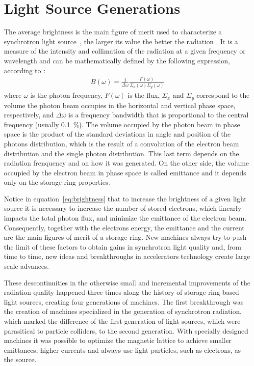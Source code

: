 \section{Light Source Generations}

    The average brightness is the main figure of merit used to characterize a synchrotron light source~\cite{Hettel2014a}, the larger its value the better the radiation . It is a measure of the intensity and collimation of the radiation at a given frequency or wavelength and can be mathematically defined by the following expression, according to :
    \begin{align}\label{eq:brightness}
        B(\omega) = \frac{1}{\Delta\omega}\frac{F(\omega)}{\Sigma_x(\omega)\Sigma_y(\omega)}
    \end{align}
    where $\omega$ is the photon frequency, $F(\omega)$ is the flux, $\Sigma_x$ and $\Sigma_y$ correspond to the volume the photon beam occupies in the horizontal and vertical phase space, respectively, and $\Delta\omega$ is a frequency bandwidth that is proportional to the central frequency (usually \SI{0.1}{\percent}). The volume occupied by the photon beam in phase space is the product of the standard deviations in angle and position of the photons distribution, which is the result of a convolution of the electron beam distribution and the single photon distribution. This last term depends on the radiation frenquency and on how it was generated. On the other side, the volume occupied by the electron beam in phase space is called emittance and it depends only on the storage ring properties.

    Notice in equation~\eqref{eq:brightness} that to increase the brightness of a given light source it is necessary to increase the number of stored electrons, which linearly impacts the total photon flux, and minimize the emittance of the electron beam. Consequently, together with the electrons energy, the emittance and the current are the main figures of merit of a storage ring. New machines always try to push the limit of these factors to obtain gains in synchrotron light quality and, from time to time, new ideas and breakthroughs in accelerators technology create large scale advances.

    These descontinuities in the otherwise small and incremental improvements of the radiation quality happened three times along the history of storage ring based light sources, creating four generations of machines. The first breakthrough was the creation of machines specialized in the generation of synchrotron radiation, which marked the difference of the first generation of light sources, which were parasitical to particle colliders, to the second generation. With specially designed machines it was possible to optimize the magnetic lattice to achieve smaller emittances, higher currents and always use light particles, such as electrons, as the source.

